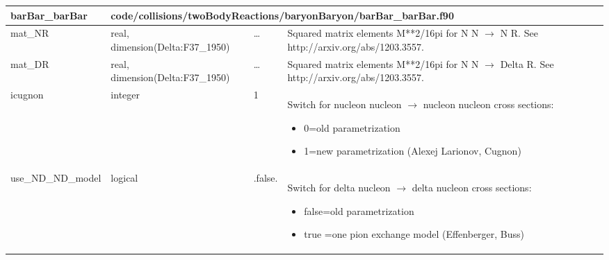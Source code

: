 \documentclass{article}
\begin{document}
\begin{longtable}{llll}
\toprule
\textbf{\large{barBar\_barBar}} & \multicolumn{3}{l}{\footnotesize{code/collisions/twoBodyReactions/baryonBaryon/barBar\_barBar.f90}}\\*
\midrule
\endfirsthead
\midrule
\endhead
mat\_NR & \begin{minipage}[t]{2cm}real, dimension(Delta:F37\_1950)\end{minipage} & \begin{minipage}[t]{2cm}\dots\end{minipage} & \begin{minipage}[t]{12cm}Squared matrix elements M**2/16pi for N N $\rightarrow$ N R. See http://arxiv.org/abs/1203.3557.\end{minipage}\\*
\midrule
mat\_DR & \begin{minipage}[t]{2cm}real, dimension(Delta:F37\_1950)\end{minipage} & \begin{minipage}[t]{2cm}\dots\end{minipage} & \begin{minipage}[t]{12cm}Squared matrix elements M**2/16pi for N N $\rightarrow$ Delta R. See http://arxiv.org/abs/1203.3557.\end{minipage}\\*
\midrule
icugnon & \begin{minipage}[t]{2cm}integer\end{minipage} & \begin{minipage}[t]{2cm}1\end{minipage} & \begin{minipage}[t]{12cm}Switch for nucleon nucleon $\rightarrow$ nucleon nucleon cross sections:\begin{itemize}\leftmargin0em\itemindent0pt\item 0=old parametrization\item 1=new parametrization (Alexej Larionov, Cugnon)\end{itemize}\end{minipage}\\*
\midrule
use\_ND\_ND\_model & \begin{minipage}[t]{2cm}logical\end{minipage} & \begin{minipage}[t]{2cm}.false.\end{minipage} & \begin{minipage}[t]{12cm}Switch for delta nucleon $\rightarrow$ delta nucleon cross sections:\begin{itemize}\leftmargin0em\itemindent0pt\item false=old parametrization\item true =one pion exchange model (Effenberger, Buss)\end{itemize}\end{minipage}\\*

\end{longtable}
\end{document}
